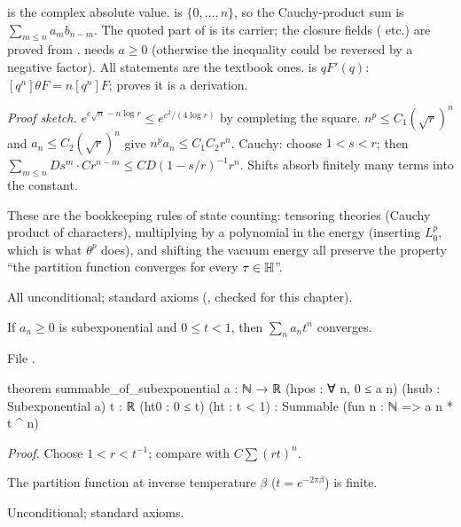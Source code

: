 \begin{dictionary}
 is the complex absolute value.  is $\{0,\dots,n\}$, so the Cauchy-product sum is
$\sum_{m\le n}a_mb_{n-m}$. The quoted part of  is its carrier; the closure fields ( etc.) are
proved from .  needs $a\ge0$ (otherwise the inequality could be
reversed by a negative factor). All statements are the textbook ones.  is $qF'(q)$:
$[q^n]\theta F = n[q^n]F$;  proves it is a derivation.
\end{dictionary}
\noindent\emph{Proof sketch.} $e^{c\sqrt n - n\log r}\le e^{c^2/(4\log r)}$ by completing the square. $n^p\le C_1(\sqrt r)^n$
and $a_n\le C_2(\sqrt r)^n$ give $n^pa_n\le C_1C_2r^n$. Cauchy: choose $1<s<r$; then $\sum_{m\le n}Ds^m\cdot Cr^{n-m}\le
CD(1-s/r)^{-1}r^n$. Shifts absorb finitely many terms into the constant.
\begin{physics}
These are the bookkeeping rules of state counting: tensoring theories (Cauchy product of characters), multiplying by a
polynomial in the energy (inserting $L_0^p$, which is what $\theta^p$ does), and shifting the vacuum energy all preserve the
property ``the partition function converges for every $\tau\in\mathbb{H}$''.
\end{physics}
\begin{status}
All unconditional; standard axioms (,  checked for this chapter).
\end{status}

\begin{theorem}\label{l14:thm:summable}
If $a_n\ge0$ is subexponential and $0\le t<1$, then $\sum_na_nt^n$ converges.
\end{theorem}
\noindent File .
\begin{leancode}
theorem summable_of_subexponential {a : ℕ → ℝ} (hpos : ∀ n, 0 ≤ a n) (hsub : Subexponential a)
    {t : ℝ} (ht0 : 0 ≤ t) (ht : t < 1) : Summable (fun n : ℕ => a n * t ^ n)
\end{leancode}
\noindent\emph{Proof.} Choose $1<r<t^{-1}$; compare with $C\sum(rt)^n$.
\begin{physics}
The partition function at inverse temperature $\beta$ ($t = e^{-2\pi\beta}$) is finite.
\end{physics}
\begin{status}
Unconditional; standard axioms.
\end{status}

